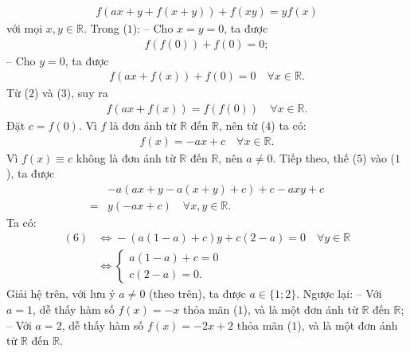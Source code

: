 \begin{multicols}{2}
\begin{align*}
		f\!\left( {ax \!+\! y \!+\! f\left( {x \!+\! y} \right)} \right) \!+\! f\!\left( {xy} \right) \!=\! yf\left( x \right) \tag{$1$}
	\end{align*}
	với mọi $x,y \in \mathbb{R}$.
	\vskip 0.05cm
	Trong ($1$):
	\vskip 0.05cm
	-- Cho $x = y = 0$, ta được
	\begin{align*}
		f\left( {f\left( 0 \right)} \right) + f\left( 0 \right) = 0; \tag{$2$}
	\end{align*}
	-- Cho $y = 0$, ta được
	\begin{align*}
		f\left( {ax + f\left( x \right)} \right) + f\left( 0 \right) = 0 \quad \forall x \in \mathbb{R}. \tag{$3$}
	\end{align*}
	Từ ($2$) và ($3$), suy ra
	\begin{align*}
		f\left( {ax + f\left( x \right)} \right) = f\left( {f\left( 0 \right)} \right) \quad\forall x \in \mathbb{R}. \tag{$4$}
	\end{align*}
	Đặt $c = f(0)$.  Vì  $f$ là đơn ánh từ $\mathbb{R}$  đến  $\mathbb{R}$, nên từ ($4$) ta có:
	\begin{align*}
		f\left( x \right) =  - ax + c \quad \forall x \in \mathbb{R}. \tag{$5$}
	\end{align*}
	Vì  $f(x) \equiv c$ không là đơn ánh từ  $\mathbb{R}$ đến  $\mathbb{R}$, nên $a \ne 0$.
	\vskip 0.05cm
	Tiếp theo, thế ($5$) vào ($1$), ta được
	\begin{align*}
		&- a\left( {ax + y - a\left( {x + y} \right) + c} \right) + c - axy + c \\
		= &y\left( { - ax + c} \right) \quad \forall x,y \in \mathbb{R}. \tag{$6$}
	\end{align*}
	Ta có:
	\begin{align*}
		(6) \!&\Leftrightarrow  \!-\! \left(\! {a\left(\! {1 \!-\! a}\! \right) \!+\! c} \!\right)\!y \!+\! c\!\left( {2 \!-\! a} \!\right) \!=\! 0 \quad\!\!\! \forall y \!\in\! \mathbb{R}\\
		&\Leftrightarrow \begin{cases}
			a(1-a) + c = 0\\
			c(2-a) = 0.
		\end{cases}
	\end{align*}  
	Giải hệ trên, với lưu ý $a \ne 0$ (theo trên), ta được $a \in \{1; 2\}$.
	\vskip 0.05cm
	Ngược lại:
	\vskip 0.05cm
	-- Với $a = 1$, dễ thấy hàm số $f(x) = -x$ thỏa mãn ($1$), và là một đơn ánh từ  $\mathbb{R}$ đến  $\mathbb{R}$;
	\vskip 0.05cm
	-- Với $a = 2$, dễ thấy hàm số  $f(x) = -2x + 2$ thỏa mãn ($1$), và là một đơn ánh từ $\mathbb{R}$ đến $\mathbb{R}$.

\end{multicols}
